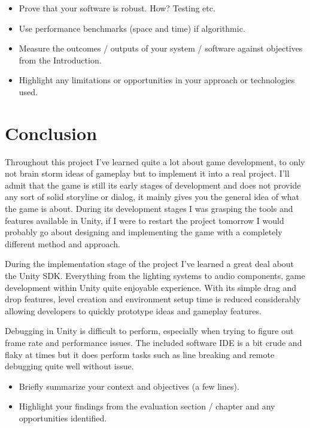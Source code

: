 \begin{itemize}
\item Prove that your software is robust. How? Testing etc. 
\item Use performance benchmarks (space and time) if algorithmic.
\item Measure the outcomes / outputs of your system / software against objectives from the Introduction.
\item Highlight any limitations or opportunities in your approach or technologies used.
\end{itemize}

\chapter{Conclusion}
Throughout this project I've learned quite a lot about game development, to only not brain storm ideas of gameplay but to implement it into a real project. I'll admit that the game is still its early stages of development and does not provide any sort of solid storyline or dialog, it mainly gives you the general idea of what the game is about. During its development stages I was grasping the tools and features available in Unity, if I were to restart the project tomorrow I would probably go about designing and implementing the game with a completely different method and approach.

During the implementation stage of the project I've learned a great deal about the Unity SDK. Everything from the lighting systems to audio components, game development within Unity quite enjoyable experience. With its simple drag and drop features, level creation and environment setup time is reduced considerably allowing developers to quickly prototype ideas and gameplay features.

Debugging in Unity is difficult to perform, especially when trying to figure out frame rate and performance issues. The included software IDE is a bit crude and flaky at times but it does perform tasks such as line breaking and remote debugging quite well without issue. 

\begin{itemize}
\item Briefly summarize your context and objectives (a few lines).
\item Highlight your findings from the evaluation section / chapter and any opportunities identified.
\end{itemize}

